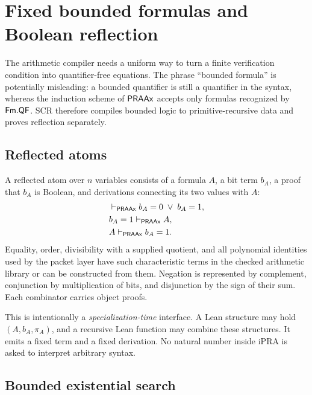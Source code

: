 \section{Fixed bounded formulas and Boolean reflection}
\label{sec:reflection}

The arithmetic compiler needs a uniform way to turn a finite verification
condition into quantifier-free equations.  The phrase ``bounded formula'' is
potentially misleading: a bounded quantifier is still a quantifier in the
syntax, whereas the induction scheme of \(\mathsf{PRAAx}\) accepts only formulas
recognized by \(\mathsf{Fm}.\mathsf{QF}\).  SCR therefore compiles bounded logic to
primitive-recursive data and proves reflection separately.

\subsection{Reflected atoms}

A reflected atom over \(n\) variables consists of a formula \(A\), a bit term
\(b_A\), a proof that \(b_A\) is Boolean, and derivations connecting its two
values with \(A\):
\[
\begin{aligned}
   &\mathrel{\vdash_{\mathsf{PRAAx}}} b_A=0\;\vee\;b_A=1,\\
   &b_A=1\mathrel{\vdash_{\mathsf{PRAAx}}} A,\\
   &A\mathrel{\vdash_{\mathsf{PRAAx}}} b_A=1.
\end{aligned}
\]
Equality, order, divisibility with a supplied quotient, and all polynomial
identities used by the packet layer have such characteristic terms in the
checked arithmetic library or can be constructed from them.  Negation is
represented by complement, conjunction by multiplication of bits, and
disjunction by the sign of their sum.  Each combinator carries object proofs.

This is intentionally a \emph{specialization-time} interface.  A Lean
structure may hold \((A,b_A,\pi_A)\), and a recursive Lean function may combine
these structures.  It emits a fixed term and a fixed derivation.  No natural
number inside iPRA is asked to interpret arbitrary syntax.

\subsection{Bounded existential search}

